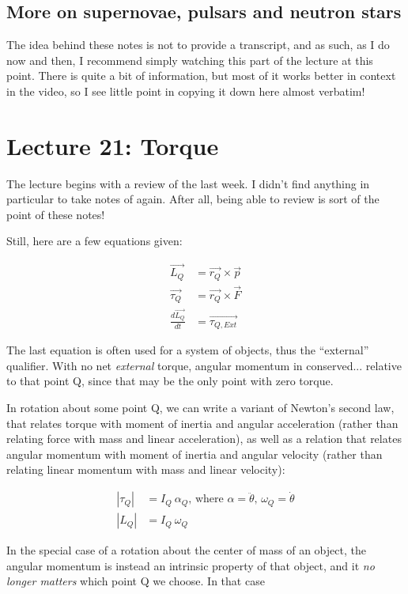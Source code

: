 \documentclass[8.01x]{subfiles}
\begin{document}
\subsection{More on supernovae, pulsars and neutron stars}

The idea behind these notes is not to provide a transcript, and as such, as I do now and then, I recommend simply watching this part of the lecture at this point. There is quite a bit of information, but most of it works better in context in the video, so I see little point in copying it down here almost verbatim!

\section{Lecture 21: Torque}

The lecture begins with a review of the last week. I didn't find anything in particular to take notes of again. After all, being able to review is sort of the point of these notes!

Still, here are a few equations given:

\begin{align}
\vec{L_Q} &= \vec{r_Q} \times \vec{p}\\
\vec{\tau_Q} &= \vec{r_Q} \times \vec{F}\\
\frac{d\vec{L_Q}}{dt} &= \vec{\tau_{Q,Ext}}
\end{align}

The last equation is often used for a system of objects, thus the ``external'' qualifier. With no net \emph{external} torque, angular momentum in conserved... relative to that point Q, since that may be the only point with zero torque.

In rotation about some point Q, we can write a variant of Newton's second law, that relates torque with moment of inertia and angular acceleration (rather than relating force with mass and linear acceleration), as well as a relation that relates angular momentum with moment of inertia and angular velocity (rather than relating linear momentum with mass and linear velocity):

\begin{align}
|\tau_Q| &= I_Q\ \alpha_Q \text{, where $\alpha = \ddot{\theta}$, $\omega_Q = \dot{\theta}$}\\
|L_Q|    &= I_Q\ \omega_Q
\end{align}

In the special case of a rotation about the center of mass of an object, the angular momentum is instead an intrinsic property of that object, and it \emph{no longer matters} which point Q we choose. In that case
\end{document}
